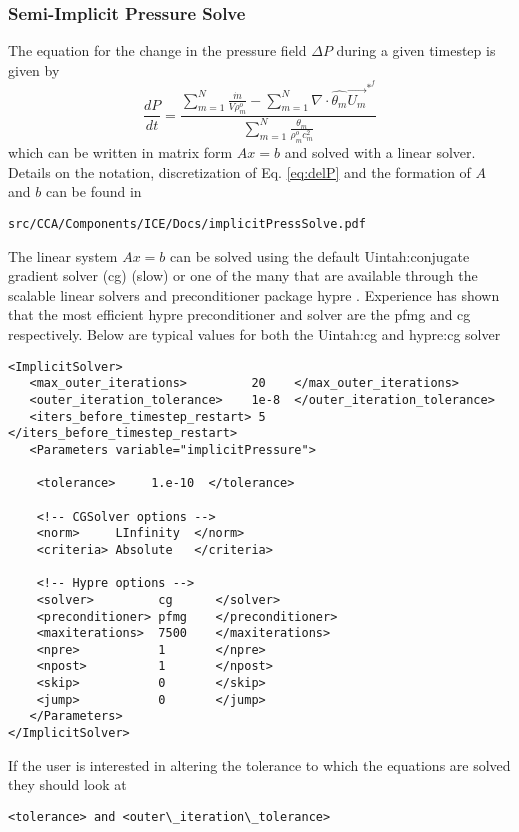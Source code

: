 \subsubsection{Semi-Implicit Pressure Solve}
The equation for the change in the pressure field $\Delta{P}$ during a given
timestep is given by
%
\begin{equation}
    \label{eq:delP}
     \frac{dP}{dt} = 
     \frac{\sum \limits_{{m}=1}^N  \frac{\dot{m}} {V \rho^{o}_m} 
        -  \sum \limits_{{m}=1}^N \nabla \cdot \widehat{\theta_m} \vec{U_m}^{*^{f}}}
          {\sum \limits_{{m}=1}^N \frac{\theta_m}{\rho^{o}_m c_m^2} }
\end{equation}
%
which can be written in matrix form $Ax = b$ and solved with a linear solver.  Details on the
notation, discretization of Eq. \ref{eq:delP} and the formation of $A$
and $b$ can be found in
%
\begin{Verbatim}[fontsize=\footnotesize]
 src/CCA/Components/ICE/Docs/implicitPressSolve.pdf
\end{Verbatim}
%
The linear system $Ax = b$ can be solved using the default Uintah:conjugate
gradient solver (cg) (slow) or one of the many that are available
through the scalable linear solvers and preconditioner package hypre
\cite{ref:hypre}. Experience has shown that the most efficient hypre
preconditioner and solver are the pfmg and cg respectively.  Below are
typical values for both the Uintah:cg and hypre:cg solver
%
\begin{Verbatim}[fontsize=\footnotesize]
<ImplicitSolver>
   <max_outer_iterations>         20    </max_outer_iterations>
   <outer_iteration_tolerance>    1e-8  </outer_iteration_tolerance>
   <iters_before_timestep_restart> 5    </iters_before_timestep_restart>
   <Parameters variable="implicitPressure">

    <tolerance>     1.e-10  </tolerance>
    
    <!-- CGSolver options -->
    <norm>     LInfinity  </norm>
    <criteria> Absolute   </criteria>

    <!-- Hypre options -->
    <solver>         cg      </solver>
    <preconditioner> pfmg    </preconditioner>
    <maxiterations>  7500    </maxiterations>
    <npre>           1       </npre>
    <npost>          1       </npost>
    <skip>           0       </skip>
    <jump>           0       </jump>
   </Parameters>
</ImplicitSolver>
\end{Verbatim}
%
If the user is interested in altering the tolerance to which the equations are solved they should look at
\begin{Verbatim}[fontsize=\footnotesize]
<tolerance> and <outer\_iteration\_tolerance>
\end{Verbatim} 
